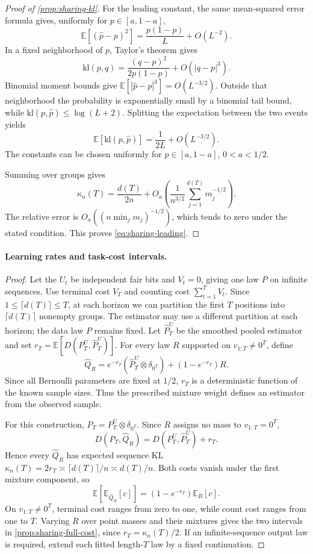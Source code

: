 \documentclass[11pt,twoside]{article}
\newcommand{\E}{\mathbb E}
\newcommand{\KL}{D}
\newcommand{\kl}{\mathrm{kl}}
\theoremstyle{definition}
\theoremstyle{remark}
\begin{document}
\begin{proof}[Proof of \cref{prop:sharing-kl}]
For the leading constant, the same mean-squared error formula gives,
uniformly for \(p\in[a,1-a]\),
\[
 \E[(\widehat p-p)^2]=\frac{p(1-p)}L+O(L^{-2}).
\]
In a fixed neighborhood of \(p\), Taylor's theorem gives
\[
 \kl(p,q)=\frac{(q-p)^2}{2p(1-p)}+O(|q-p|^3).
\]
Binomial moment bounds give
\(\E[|\widehat p-p|^3]=O(L^{-3/2})\).
Outside that neighborhood the probability is exponentially small
by a binomial tail bound, while
\(\kl(p,\widehat p)\le\log(L+2)\).
Splitting the expectation between the two events yields
\[
 \E[\kl(p,\widehat p)]
 =\frac1{2L}+O(L^{-3/2}).
\]
The constants can be chosen uniformly for \(p\in[a,1-a]\),
\(0<a<1/2\).

Summing over groups gives
\[
 \kappa_n(T)=\frac{d(T)}{2n}
 +O_a\!\left(\frac1{n^{3/2}}
              \sum_{j=1}^{d(T)}m_j^{-1/2}\right).
\]
The relative error is \(O_a((n\min_j m_j)^{-1/2})\), which tends
to zero under the stated condition.
This proves \cref{eq:sharing-leading}.
\end{proof}

\paragraph{Learning rates and task-cost intervals.}
\sharingfullcost*

\begin{proof}
Let the \(U_t\) be independent fair bits and \(V_t=0\), giving one law
\(P\) on infinite sequences. Use terminal cost \(V_T\) and counting
cost \(\sum_{t=1}^T V_t\).
Since \(1\le\lceil d(T)\rceil\le T\), at each horizon we can partition
the first \(T\) positions into \(\lceil d(T)\rceil\) nonempty groups.
The estimator may use a different partition at each horizon; the data
law \(P\) remains fixed.
Let \(\widehat P^U_T\) be the smoothed pooled estimator and set
\(r_T=\E[\KL(P^U_T,\widehat P^U_T)]\). For every law \(R\)
supported on \(v_{1:T}\ne0^T\), define
\[
 \widehat Q_R=e^{-r_T}(\widehat P^U_T\otimes\delta_{0^T})
 +(1-e^{-r_T})R.
\]
Since all Bernoulli parameters are
fixed at \(1/2\), \(r_T\) is a deterministic function of the known
sample sizes. Thus the prescribed mixture weight defines an estimator
from the observed sample.

For this construction, \(P_T=P^U_T\otimes\delta_{0^T}\).
Since \(R\) assigns no mass to \(v_{1:T}=0^T\),
\[
 \KL(P_T,\widehat Q_R)
 =\KL(P^U_T,\widehat P^U_T)+r_T.
\]
Hence every \(\widehat Q_R\) has expected sequence KL
\(\kappa_n(T)=2r_T\asymp \lceil d(T)\rceil/n\asymp d(T)/n\).
Both costs vanish under the first
mixture component, so
\[
 \E\!\left[\E_{\widehat Q_R}[c]\right]
 =(1-e^{-r_T})\E_R[c].
\]
On \(v_{1:T}\ne0^T\), terminal cost ranges from zero to one, while count
cost ranges from one to \(T\). Varying \(R\) over point masses and their
mixtures gives the two intervals in \cref{prop:sharing-full-cost}, since
\(r_T=\kappa_n(T)/2\).
If an infinite-sequence output law is required, extend each fitted
length-\(T\) law by a fixed continuation.
\end{proof}
\end{document}
